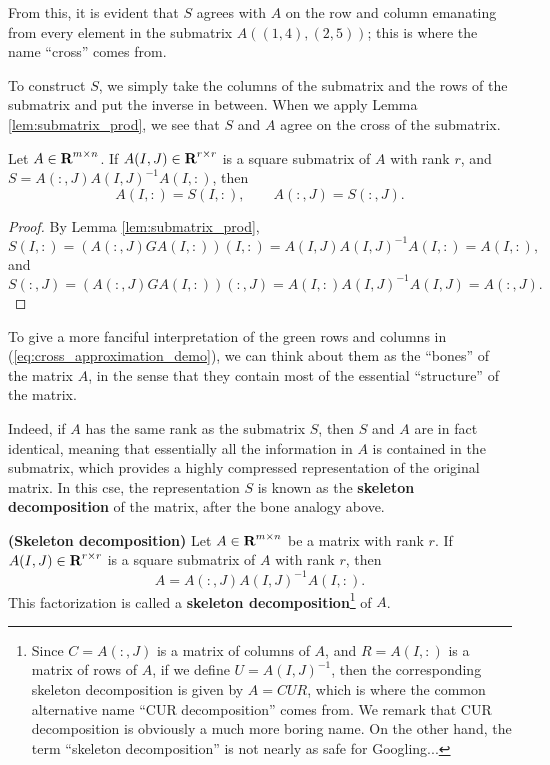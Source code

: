 \documentclass{article}
\begin{document}
	From this, it is evident that $S$ agrees with $A$ on the row and column emanating from every element in the submatrix $A((1,4),(2,5))$; this is where the name ``cross'' comes from.
	
	To construct $S$, we simply take the columns of the submatrix and the rows of the submatrix and put the inverse in between. When we apply Lemma \ref{lem:submatrix_prod}, we see that $S$ and $A$ agree on the cross of the submatrix.
	
	\begin{thm}
		\label{thm:skeleton_submatrix_exact}
		Let $A \in \textnormal{\bf R}^{m\times n}$. If $A(I,J) \in \textnormal{\bf R}^{r\times r}$ is a square submatrix of $A$ with rank $r$, and $S = A(:,J)A(I,J)^{-1}A(I,:)$, then
		\begin{equation}
			\label{eq:skeleton_submatrix_exact}
			A(I,:) = S(I,:), \qquad A(:,J) = S(:,J).
		\end{equation}
	\end{thm}
	
	\begin{proof}
		By Lemma \ref{lem:submatrix_prod},
		\begin{equation}
			S(I,:) = (A(:, J)GA(I,:))(I,:) = A(I,J)A(I,J)^{-1}A(I,:) = A(I,:),
		\end{equation}
		and
		\begin{equation}
			S(:,J) = (A(:, J)GA(I,:))(:,J) = A(I,:)A(I,J)^{-1}A(I,J) = A(:, J).
		\end{equation}
	\end{proof}
	
	To give a more fanciful interpretation of the green rows and columns in (\ref{eq:cross_approximation_demo}), we can think about them as the ``bones'' of the matrix $A$, in the sense that they contain most of the essential ``structure'' of the matrix. 
	
	Indeed, if $A$ has the same rank as the submatrix $S$, then $S$ and $A$ are in fact identical, meaning that essentially all the information in $A$ is contained in the submatrix, which provides a highly compressed representation of the original matrix. In this cse, the representation $S$ is known as the \textbf{skeleton decomposition} of the matrix, after the bone analogy above.
	
	\begin{thm}
		\label{thm:skeleton_decomposition} \textnormal{\bf(Skeleton decomposition)}
		Let $A \in \textnormal{\bf R}^{m\times n}$ be a matrix with rank $r$. If $A(I,J) \in \textnormal{\bf R}^{r\times r}$ is a square submatrix of $A$ with rank $r$, then
		\begin{equation}
			\label{eq:skeleton}
			A = A(:,J)A(I,J)^{-1}A(I,:).
		\end{equation}
		This factorization is called a \textbf{skeleton decomposition}\footnote{Since $C = A(:,J)$ is a matrix of columns of $A$, and $R = A(I,:)$ is a matrix of rows of $A$, if we define $U = A(I,J)^{-1}$, then the corresponding skeleton decomposition is given by $A = CUR$, which is where the common alternative name ``CUR decomposition'' comes from. We remark that CUR decomposition is obviously a much more boring name. On the other hand, the term ``skeleton decomposition'' is not nearly as safe for Googling...} of $A$.
	\end{thm}
	
\end{document}
